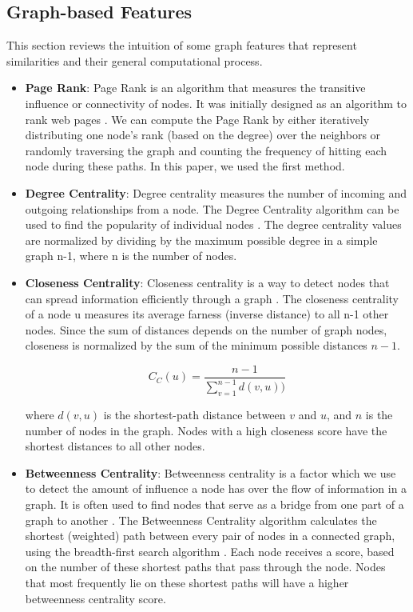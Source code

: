 \documentclass[a4paper,fleqn]{cas-dc}
\begin{document}
\subsection{Graph-based Features}
\label{gbfeatures}
This section reviews the intuition of some graph features that represent similarities and their general computational process.
\begin{itemize}

	\item \textbf{Page Rank}: Page Rank is an algorithm that measures the transitive influence or connectivity of nodes. It was initially designed as an algorithm to rank web pages \citep{54xing2004a}. We can compute the Page Rank by either iteratively distributing one node's rank (based on the degree) over the neighbors or randomly traversing the graph and counting the frequency of hitting each node during these paths. In this paper, we used the first method.

	\item \textbf{Degree Centrality}: Degree centrality measures the number of incoming and outgoing relationships from a node. The Degree Centrality algorithm can be used to find the popularity of individual nodes \citep{46freeman1979a}. The degree centrality values are normalized by dividing by the maximum possible degree in a simple graph n-1, where n is the number of nodes.

	\item \textbf{Closeness Centrality}: Closeness centrality is a way to detect nodes that can spread information efficiently through a graph \citep{46freeman1979a}. The closeness centrality of a node u measures its average farness (inverse distance) to all n-1 other nodes. Since the sum of distances depends on the number of graph nodes, closeness is normalized by the sum of the minimum possible distances $n-1$.

	      \begin{equation}
		      C_C(u) = \frac{n-1}{\sum_{v=1}^{n-1}d(v,u))}
	      \end{equation}

	      where $d(v,u)$ is the shortest-path distance between $v$ and $u$, and $n$ is the number of nodes in the graph. Nodes with a high closeness score have the shortest distances to all other nodes.

	\item \textbf{Betweenness Centrality}: Betweenness centrality is a factor which we use to detect the amount of influence a node has over the flow of information in a graph. It is often used to find nodes that serve as a bridge from one part of a graph to another \citep{55moore1959a}. The Betweenness Centrality algorithm calculates the shortest (weighted) path between every pair of nodes in a connected graph, using the breadth-first search algorithm \citep{55moore1959a}. Each node receives a score, based on the number of these shortest paths that pass through the node. Nodes that most frequently lie on these shortest paths will have a higher betweenness centrality score.


\end{itemize}
\end{document}
